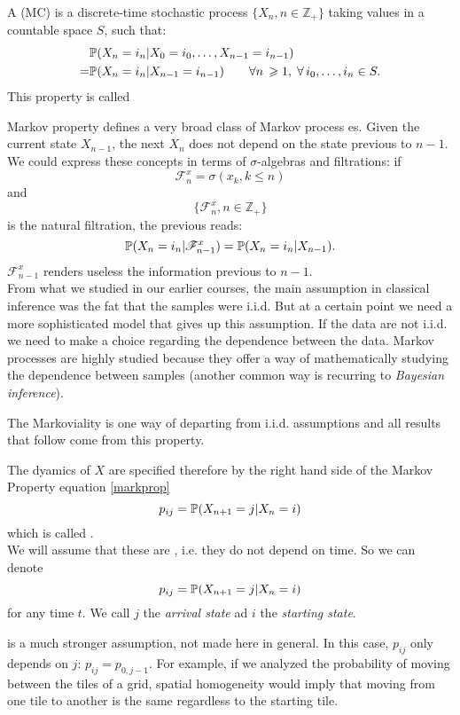 \documentclass{article}
\begin{document}
	\begin{definition}
		A  (MC) is a discrete-time stochastic process $\{X_n,n\in\mathbb{Z}_+\}$ taking values in a countable space $S$, such that:
		\begin{align}\label{markprop}
			&\mathbb{P}(X_n=i_n|X_0=i_0,\ldots,X_{n-1}=i_{n-1})\\
			=&\mathbb{P}(X_n=i_n|X_{n-1}=i_{n-1})\qquad\forall n\,\geqslant1,\;\forall\,i_0,\ldots,i_n \in S.
		\end{align}
		This property is called 
	\end{definition}
	Markov property defines a very broad class of Markov process es. Given the current state $X_{n-1}$, the next $X_n$ does not depend on the state previous to $n-1$. We could express these concepts in terms of $\sigma$-algebras and filtrations: if
	\[
	\mathscr{F}^x_n=\sigma(x_k, k\leqslant n)
	\]
	and 
	\[
	\{\mathscr{F}^x_n,n\in \mathbb{Z}_+\}
	\]
	is the natural filtration, the previous reads:
	\[
	\mathbb{P}(X_n=i_n|\mathscr{F}^x_{n-1})=\mathbb{P}(X_n=i_n|X_{n-1}).
	\]
	$\mathscr{F}^x_{n-1}$ renders useless the information previous to $n-1$.\bigskip\\
	From what we studied in our earlier courses, the main assumption in classical inference was the fat that the samples were i.i.d. But at a certain point we need a more sophisticated model that gives up this assumption. If the data are not i.i.d. we need to make a choice regarding the dependence between the data. Markov processes are highly studied because they offer a way of mathematically studying the dependence between samples (another common way is recurring to \textit{Bayesian inference}). 
	\begin{remark}
		The Markoviality is one way of departing from i.i.d. assumptions and all results that follow come from this property.
	\end{remark}
	The dyamics of $X$ are specified therefore by the right hand side of the Markov Property equation \ref{markprop}
	\[p_{ij}=\mathbb{P}(X_{n+1}=j|X_n=i)\]
	which is called .\\
	We will assume that these are , i.e. they do not depend on time. So we can denote
	\[p_{ij}=\mathbb{P}(X_{n+1}=j|X_n=i) \]
	for any time $t$. We call $j$ the \textit{arrival state} ad $i$ the \textit{starting state}.
	\begin{remark}
		 is a much stronger assumption, not made here in general. In this case, $p_{ij}$ only depends on $j$: $p_{ij}=p_{0, j-1}$. For example, if we analyzed the probability of moving between the tiles of a grid, spatial homogeneity would imply that moving from one tile to another is the same regardless to the starting tile.
	\end{remark}
	
\end{document}
